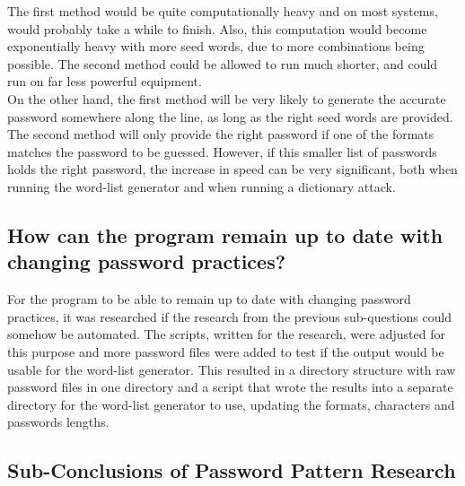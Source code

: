 \documentclass[a4paper,12pt]{article}
\begin{document}
The first method would be quite computationally heavy and on most systems, would probably take a while to finish. Also, this computation would become exponentially heavy with more seed words, due to more combinations being possible. The second method could be allowed to run much shorter, and could run on far less powerful equipment.\\
On the other hand, the first method will be very likely to generate the accurate password somewhere along the line, as long as the right seed words are provided. The second method will only provide the right password if one of the formats matches the password to be guessed. However, if this smaller list of passwords holds the right password, the increase in speed can be very significant, both when running the word-list generator and when running a dictionary attack.

\subsection{How can the program remain up to date with changing password practices?}
For the program to be able to remain up to date with changing password practices, it was researched if the research from the previous sub-questions could somehow be automated. The scripts, written for the research, were adjusted for this purpose and more password files were added to test if the output would be usable for the word-list generator. This resulted in a directory structure with raw password files in one directory and a script that wrote the results into a separate directory for the word-list generator to use, updating the formats, characters and passwords lengths.

\subsection{Sub-Conclusions of Password Pattern Research}
\end{document}
